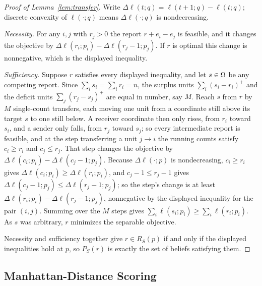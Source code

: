 \begin{proof}[Proof of Lemma~\ref{lem:transfer}]
Write \(\Delta\ell(t;q)=\ell(t+1;q)-\ell(t;q)\); discrete convexity of \(\ell(\cdot;q)\) means \(\Delta\ell(\cdot;q)\) is nondecreasing.

\emph{Necessity.}
For any \(i,j\) with \(r_j>0\) the report \(r+e_i-e_j\) is feasible, and it changes the objective by \(\Delta\ell(r_i;p_i)-\Delta\ell(r_j-1;p_j)\).
If \(r\) is optimal this change is nonnegative, which is the displayed inequality.

\emph{Sufficiency.}
Suppose \(r\) satisfies every displayed inequality, and let \(s\in\Omega\) be any competing report.
Since \(\sum_i s_i=\sum_i r_i=n\), the surplus units \(\sum_i(s_i-r_i)^+\) and the deficit units \(\sum_j(r_j-s_j)^+\) are equal in number, say \(M\).
Reach \(s\) from \(r\) by \(M\) single-count transfers, each moving one unit from a coordinate still above its target \(s\) to one still below.
A receiver coordinate then only rises, from \(r_i\) toward \(s_i\), and a sender only falls, from \(r_j\) toward \(s_j\); so every intermediate report is feasible, and at the step transferring a unit \(j\to i\) the running counts satisfy \(c_i\ge r_i\) and \(c_j\le r_j\).
That step changes the objective by \(\Delta\ell(c_i;p_i)-\Delta\ell(c_j-1;p_j)\).
Because \(\Delta\ell(\cdot;p)\) is nondecreasing, \(c_i\ge r_i\) gives \(\Delta\ell(c_i;p_i)\ge\Delta\ell(r_i;p_i)\), and \(c_j-1\le r_j-1\) gives \(\Delta\ell(c_j-1;p_j)\le\Delta\ell(r_j-1;p_j)\); so the step's change is at least \(\Delta\ell(r_i;p_i)-\Delta\ell(r_j-1;p_j)\), nonnegative by the displayed inequality for the pair \((i,j)\).
Summing over the \(M\) steps gives \(\sum_i\ell(s_i;p_i)\ge\sum_i\ell(r_i;p_i)\).
As \(s\) was arbitrary, \(r\) minimizes the separable objective.

Necessity and sufficiency together give \(r\in R_S(p)\) if and only if the displayed inequalities hold at \(p\), so \(P_S(r)\) is exactly the set of beliefs satisfying them.
\end{proof}

\subsection{Manhattan-Distance Scoring}
\label{app:manhattan-proof}

